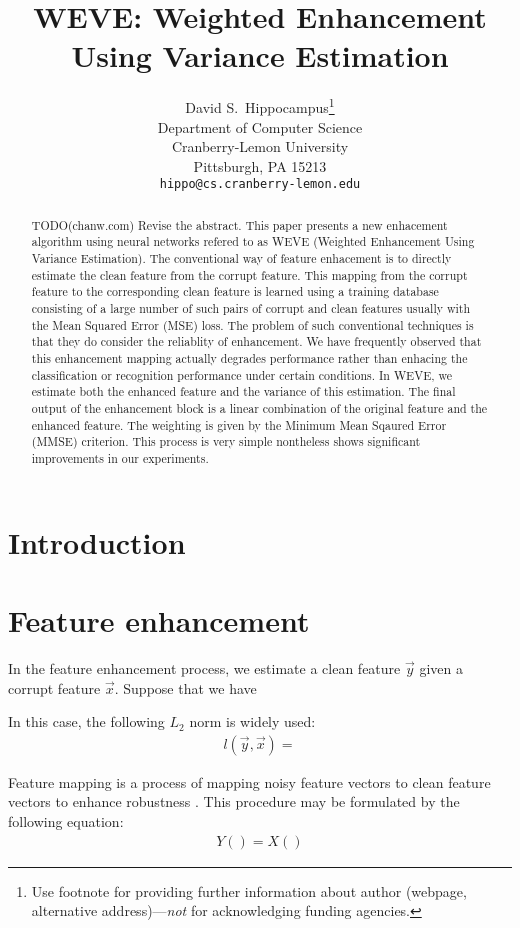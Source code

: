 \documentclass{article}
\title{WEVE: Weighted Enhancement Using Variance Estimation}
\author{
  David S.~Hippocampus\thanks{Use footnote for providing further
    information about author (webpage, alternative
    address)---\emph{not} for acknowledging funding agencies.} \\
  Department of Computer Science\\
  Cranberry-Lemon University\\
  Pittsburgh, PA 15213 \\
  \texttt{hippo@cs.cranberry-lemon.edu} \\
}
\begin{document}

\maketitle

\begin{abstract}
TODO(chanw.com) Revise the abstract.
This paper presents a new enhacement algorithm using neural networks 
refered to as WEVE (Weighted Enhancement Using Variance Estimation).
The conventional way of feature enhacement is to directly estimate the clean
feature from the corrupt feature. This mapping from the corrupt feature
to the corresponding clean feature is learned using a training database
consisting of a large number of such pairs of corrupt and clean features
usually with the Mean Squared Error (MSE) loss. The problem of such 
conventional techniques is that they do consider the reliablity of enhancement.
We have frequently observed that this enhancement mapping actually degrades
performance rather than enhacing the classification or recognition
performance under certain conditions.  In WEVE, we estimate both the enhanced 
feature and the variance of this estimation. The final output of the enhancement 
block is a linear combination of the original feature and the 
enhanced feature. The weighting is given by the Minimum Mean
Sqaured Error (MMSE) criterion. This process is very simple nontheless
shows significant improvements in our experiments.
\end{abstract}

\section{Introduction}

\section{Feature enhancement}


In the feature enhancement process, we estimate a clean feature 
$\vec{y}$ given a corrupt feature $\vec{x}$. Suppose that
we have 

In this case, the following $L_2$ norm is widely used:
\begin{align}
  l(\vec{y}, \vec{x}) = 
\end{align}




Feature mapping is a process of mapping noisy feature vectors
to clean feature vectors to enhance robustness
\cite{C_Kim_ASRU_2009_1, k_han_taslp_2015_00, k_han_icassp_2014_00}.
This procedure may be formulated by the following equation:
\begin{align}
  Y() = X()
\end{align}
\end{document}
